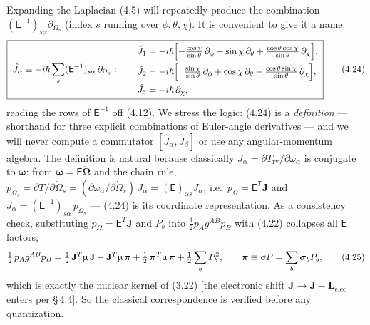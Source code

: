 Expanding the Laplacian (4.5) will repeatedly produce the combination $(\mathsf E^{-1})_{s\alpha}\partial_{\Omega_s}$ (index $s$ running over $\phi,\theta,\chi$). It is convenient to give it a name:
\begin{equation}
\boxed{\;
\hat J_\alpha\equiv-i\hbar\sum_{s}(\mathsf E^{-1})_{s\alpha}\,\partial_{\Omega_s}:\qquad
\begin{aligned}
\hat J_1&=-i\hbar\Bigl[-\tfrac{\cos\chi}{\sin\theta}\,\partial_\phi+\sin\chi\,\partial_\theta+\tfrac{\cos\theta\cos\chi}{\sin\theta}\,\partial_\chi\Bigr],\\
\hat J_2&=-i\hbar\Bigl[\ \ \tfrac{\sin\chi}{\sin\theta}\,\partial_\phi+\cos\chi\,\partial_\theta-\tfrac{\cos\theta\sin\chi}{\sin\theta}\,\partial_\chi\Bigr],\\
\hat J_3&=-i\hbar\,\partial_\chi ,
\end{aligned}\;}\tag{4.24}
\end{equation}
reading the rows of $\mathsf E^{-1}$ off (4.12). We stress the logic: (4.24) is a \emph{definition} --- shorthand for three explicit combinations of Euler-angle derivatives --- and we will never compute a commutator $[\hat J_\alpha,\hat J_\beta]$ or use any angular-momentum algebra. The definition is natural because classically $J_\alpha=\partial T_{\mathrm{rv}}/\partial\omega_\alpha$ is conjugate to $\boldsymbol\omega$: from $\boldsymbol\omega=\mathsf E\dot{\boldsymbol\Omega}$ and the chain rule, $p_{\Omega_s}=\partial T/\partial\dot\Omega_s=(\partial\omega_\alpha/\partial\dot\Omega_s)\,J_\alpha=(\mathsf E)_{\alpha s}J_\alpha$, i.e.\ $p_\Omega=\mathsf E^{T}\mathbf J$ and $J_\alpha=(\mathsf E^{-1})_{s\alpha}\,p_{\Omega_s}$ --- (4.24) is its coordinate representation. As a consistency check, substituting $p_\Omega=\mathsf E^{T}\mathbf J$ and $P_b$ into $\tfrac12 p_A g^{AB}p_B$ with (4.22) collapses all $\mathsf E$ factors,
\begin{equation}
\tfrac12\,p_Ag^{AB}p_B
=\tfrac12\,\mathbf J^{T}\upmu\,\mathbf J-\mathbf J^{T}\upmu\,\boldsymbol\pi+\tfrac12\,\boldsymbol\pi^{T}\upmu\,\boldsymbol\pi+\tfrac12\sum_bP_b^2,
\qquad \boldsymbol\pi\equiv\upsigma P=\sum_b\boldsymbol\sigma_bP_b , \tag{4.25}
\end{equation}
which is exactly the nuclear kernel of (3.22) [the electronic shift $\mathbf J\to\mathbf J-\mathbf L_{\mathrm{elec}}$ enters per \S\,4.4]. So the classical correspondence is verified before any quantization.

